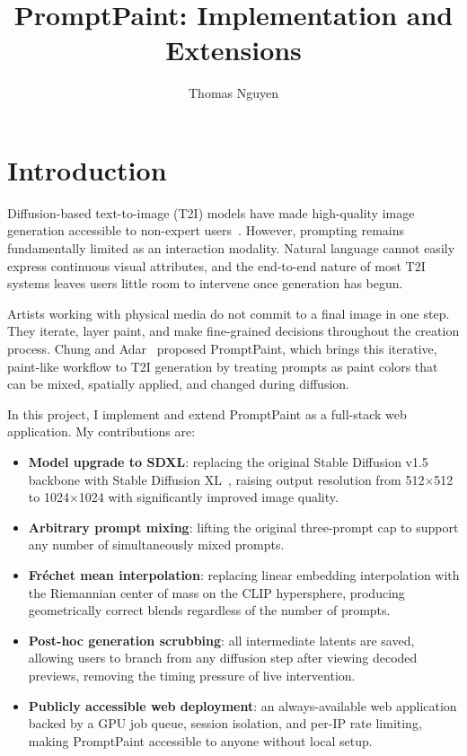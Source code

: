 \documentclass[sigconf]{acmart}
\title{PromptPaint: Implementation and Extensions}
\author{Thomas Nguyen}
\affiliation{%
  \institution{University of Toronto, Canada}
}
\begin{document}
\maketitle

\section{Introduction}

Diffusion-based text-to-image (T2I) models have made high-quality image generation
accessible to non-expert users~\cite{ramesh2022hierarchical,rombach2022high}.
However, prompting remains fundamentally limited as an interaction modality.
Natural language cannot easily express continuous visual attributes, and the
end-to-end nature of most T2I systems leaves users little room to intervene
once generation has begun.

Artists working with physical media do not commit to a final image in one step.
They iterate, layer paint, and make fine-grained decisions throughout the
creation process. Chung and Adar~\cite{chung2023promptpaint} proposed
PromptPaint, which brings this iterative, paint-like workflow to T2I generation
by treating prompts as paint colors that can be mixed, spatially applied, and
changed during diffusion.

In this project, I implement and extend PromptPaint as a full-stack web
application. My contributions are:

\begin{itemize}
  \item \textbf{Model upgrade to SDXL}: replacing the original Stable Diffusion
        v1.5 backbone with Stable Diffusion XL~\cite{podell2023sdxl}, raising
        output resolution from 512$\times$512 to 1024$\times$1024 with
        significantly improved image quality.
  \item \textbf{Arbitrary prompt mixing}: lifting the original three-prompt cap
        to support any number of simultaneously mixed prompts.
  \item \textbf{Fréchet mean interpolation}: replacing linear embedding
        interpolation with the Riemannian center of mass on the CLIP hypersphere,
        producing geometrically correct blends regardless of the number of prompts.
  \item \textbf{Post-hoc generation scrubbing}: all intermediate latents are saved,
        allowing users to branch from any diffusion step after viewing decoded previews,
        removing the timing pressure of live intervention.
  \item \textbf{Publicly accessible web deployment}: an always-available web
        application backed by a GPU job queue, session isolation, and per-IP
        rate limiting, making PromptPaint accessible to anyone without local
        setup.
\end{itemize}
\end{document}
